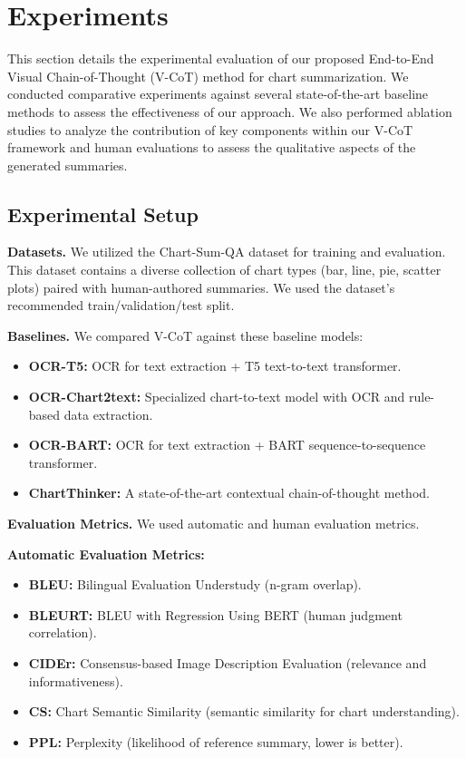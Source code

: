\section{Experiments}

This section details the experimental evaluation of our proposed End-to-End Visual Chain-of-Thought (V-CoT) method for chart summarization. We conducted comparative experiments against several state-of-the-art baseline methods to assess the effectiveness of our approach.  We also performed ablation studies to analyze the contribution of key components within our V-CoT framework and human evaluations to assess the qualitative aspects of the generated summaries.

\subsection{Experimental Setup}

\textbf{Datasets.} We utilized the Chart-Sum-QA dataset for training and evaluation. This dataset contains a diverse collection of chart types (bar, line, pie, scatter plots) paired with human-authored summaries. We used the dataset's recommended train/validation/test split.

\textbf{Baselines.} We compared V-CoT against these baseline models:

\begin{itemize}
    \item \textbf{OCR-T5:}  OCR for text extraction + T5 text-to-text transformer.
    \item \textbf{OCR-Chart2text:}  Specialized chart-to-text model with OCR and rule-based data extraction.
    \item \textbf{OCR-BART:}  OCR for text extraction + BART sequence-to-sequence transformer.
    \item \textbf{ChartThinker:}  A state-of-the-art contextual chain-of-thought method.
\end{itemize}

\textbf{Evaluation Metrics.} We used automatic and human evaluation metrics.

\textbf{Automatic Evaluation Metrics:}
\begin{itemize}
    \item \textbf{BLEU:} Bilingual Evaluation Understudy (n-gram overlap).
    \item \textbf{BLEURT:} BLEU with Regression Using BERT (human judgment correlation).
    \item \textbf{CIDEr:} Consensus-based Image Description Evaluation (relevance and informativeness).
    \item \textbf{CS:} Chart Semantic Similarity (semantic similarity for chart understanding).
    \item \textbf{PPL:} Perplexity (likelihood of reference summary, lower is better).
\end{itemize}

